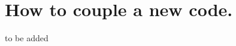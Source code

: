 \section{How to couple a new code.  \\ \vspace{2 mm} {\small }}
\label{sec:newCodeCoupling}
to be added 
 